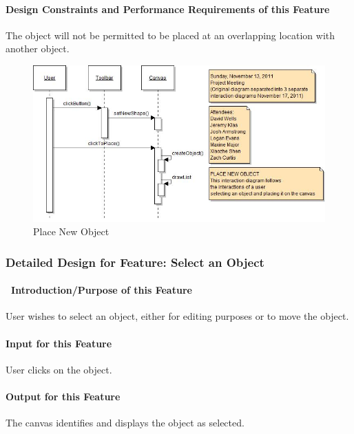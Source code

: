 \documentclass[twoside,letterpaper]{article}
\begin{document}
{\paragraph{Design Constraints and Performance Requirements of this Feature}
{
The object will not be permitted to be placed at an overlapping location with another object.
}
\bigskip
\bigskip

\begin{figure}[h]
\centering
\includegraphics[width=6.0in]{IntNewObj.jpg}
\caption{Place New Object}
\end{figure}

\clearpage


% 
%

\subsubsection{Detailed Design for Feature: Select an Object}

\paragraph[\ Introduction/Purpose of this Feature]
{\ Introduction/Purpose of this Feature}
{
User wishes to select an object, either for editing purposes or to move the object.
}

\paragraph[Input for this Feature]{Input for this Feature}
{
User clicks on the object.
}

\paragraph{Output for this Feature}
{
The canvas identifies and displays the object as selected.
}

}
\end{document}
